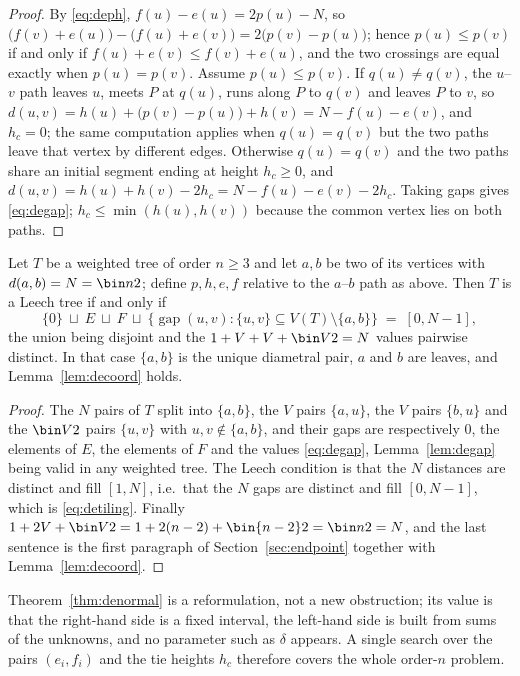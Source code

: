 \begin{proof}
By \eqref{eq:deph}, $f(u)-e(u)=2p(u)-N$, so
$\bigl(f(v)+e(u)\bigr)-\bigl(f(u)+e(v)\bigr)=2\bigl(p(v)-p(u)\bigr)$; hence
$p(u)\le p(v)$ if and only if $f(u)+e(v)\le f(v)+e(u)$, and the two crossings
are equal exactly when $p(u)=p(v)$.  Assume $p(u)\le p(v)$.  If
$q(u)\ne q(v)$, the $u$--$v$ path leaves $u$, meets $P$ at $q(u)$, runs along
$P$ to $q(v)$ and leaves $P$ to $v$, so
$d(u,v)=h(u)+\bigl(p(v)-p(u)\bigr)+h(v)=N-f(u)-e(v)$, and $h_c=0$; the same
computation applies when $q(u)=q(v)$ but the two paths leave that vertex by
different edges.  Otherwise $q(u)=q(v)$ and the two paths share an initial
segment ending at height $h_c\ge0$, and
$d(u,v)=h(u)+h(v)-2h_c=N-f(u)-e(v)-2h_c$.  Taking gaps gives \eqref{eq:degap};
$h_c\le\min(h(u),h(v))$ because the common vertex lies on both paths.
\end{proof}

\begin{theorem}\label{thm:denormal}
Let $T$ be a weighted tree of order $n\ge3$ and let $a,b$ be two of its vertices
with $d(a,b)=N=\bin n2$; define $p,h,e,f$ relative to the $a$--$b$ path as
above.  Then $T$ is a Leech tree if and only if
\begin{equation}\label{eq:detiling}
  \{0\}\ \sqcup\ E\ \sqcup\ F\ \sqcup\
  \bigl\{\operatorname{gap}(u,v):\{u,v\}\subseteq V(T)\setminus\{a,b\}\bigr\}
  \;=\;[0,N-1],
\end{equation}
the union being disjoint and the
$1+V+V+\bin V2=N$ values pairwise distinct.  In that case $\{a,b\}$ is the
unique diametral pair, $a$ and $b$ are leaves, and Lemma~\ref{lem:decoord}
holds.
\end{theorem}

\begin{proof}
The $N$ pairs of $T$ split into $\{a,b\}$, the $V$ pairs $\{a,u\}$, the $V$
pairs $\{b,u\}$ and the $\bin V2$ pairs $\{u,v\}$ with $u,v\notin\{a,b\}$, and
their gaps are respectively $0$, the elements of $E$, the elements of $F$ and
the values \eqref{eq:degap}, Lemma~\ref{lem:degap} being valid in any weighted
tree.  The Leech condition is that the $N$ distances are distinct and fill
$[1,N]$, i.e.\ that the $N$ gaps are distinct and fill $[0,N-1]$, which is
\eqref{eq:detiling}.  Finally
$1+2V+\bin V2=1+2(n-2)+\bin{n-2}2=\bin n2=N$, and the last sentence is the
first paragraph of Section~\ref{sec:endpoint} together with
Lemma~\ref{lem:decoord}.
\end{proof}

Theorem~\ref{thm:denormal} is a reformulation, not a new obstruction; its value
is that the right-hand side is a fixed interval, the left-hand side is built
from sums of the unknowns, and no parameter such as $\delta$ appears.  A single
search over the pairs $(e_i,f_i)$ and the tie heights $h_c$ therefore covers
the whole order-$n$ problem.

